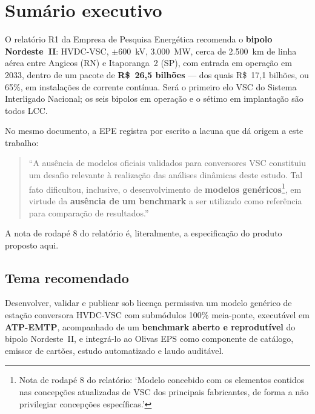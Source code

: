 \documentclass[12pt,a4paper]{article}
\newenvironment{citacao}
  {\begin{quote}\singlespacing\small\setlength{\leftskip}{2.5cm}\noindent}
  {\par\end{quote}}
\newcommand{\fonte}[1]{\par\vspace{2pt}\noindent{\footnotesize\textcolor{gray}{#1}}}
\begin{document}
\tableofcontents
\clearpage
{}

\section{Sumário executivo}

O relatório R1 da Empresa de Pesquisa Energética recomenda o \textbf{bipolo Nordeste~II}:
HVDC-VSC, $\pm$600~kV, 3.000~MW, cerca de 2.500~km de linha aérea entre Angicos (RN) e
Itaporanga~2 (SP), com entrada em operação em 2033, dentro de um pacote de
\textbf{R\$~26,5 bilhões} --- dos quais R\$~17,1 bilhões, ou 65\%, em instalações de corrente
contínua. Será o primeiro elo VSC do Sistema Interligado Nacional; os seis bipolos em operação e o
sétimo em implantação são todos LCC.

No mesmo documento, a EPE registra por escrito a lacuna que dá origem a este trabalho:

\begin{citacao}
\enquote{A ausência de modelos oficiais validados para conversores VSC constituiu um desafio
relevante à realização das análises dinâmicas deste estudo. Tal fato dificultou, inclusive, o
desenvolvimento de \textbf{modelos genéricos}\footnote{Nota de rodapé 8 do relatório:
\enquote{Modelo concebido com os elementos contidos nas concepções atualizadas de VSC dos
principais fabricantes, de forma a não privilegiar concepções específicas.}}, em virtude da
\textbf{ausência de um benchmark} a ser utilizado como referência para comparação de resultados.}
\fonte{EPE-DEE-RE-071/2025-rev0, p.~21, \S1.5.5.}
\end{citacao}

A nota de rodapé 8 do relatório é, literalmente, a especificação do produto proposto aqui.

\subsection{Tema recomendado}

Desenvolver, validar e publicar sob licença permissiva um modelo genérico de estação conversora
HVDC-VSC com submódulos 100\% meia-ponte, executável em \textbf{ATP-EMTP}, acompanhado de um
\textbf{benchmark aberto e reprodutível} do bipolo Nordeste~II, e integrá-lo ao Olivas EPS como
componente de catálogo, emissor de cartões, estudo automatizado e laudo auditável.
\end{document}
